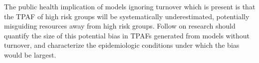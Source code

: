 The public health implication of models ignoring turnover which is present
is that the TPAF of high risk groups will be systematically underestimated,
potentially misguiding resources away from high risk groups.
Follow on research should quantify the size of
this potential bias in TPAFs generated from models without turnover,
and characterize the epidemiologic conditions under which the bias would be largest.
